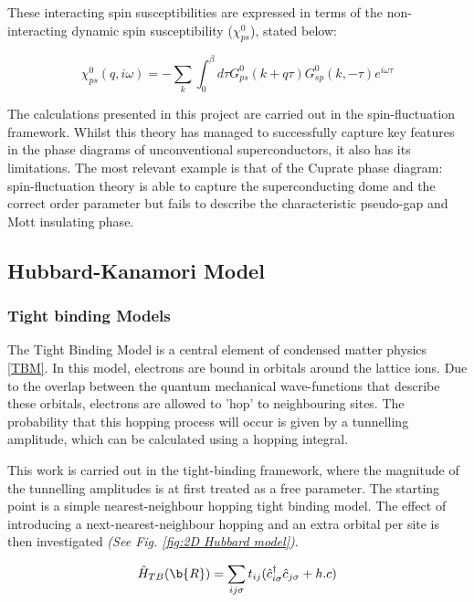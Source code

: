 \documentclass[12pt]{article}
\begin{document}
\noindent These interacting spin susceptibilities are expressed in terms of the non-interacting dynamic spin susceptibility ($\chi_{ps}^0$)\cite{moriya2000spin}, stated below: 

\begin{equation}\label{chi 0}
    \chi_{ps}^0(q, i \omega) = -\sum_{k} \int_{0}^{\beta} d\tau G^0_{ps}(k+q \tau) G^0_{sp}(k, -\tau)e^{i\omega \tau}
\end{equation} 

\noindent The calculations presented in this project are carried out in the spin-fluctuation framework. 
Whilst this theory has managed to successfully capture key features in the phase diagrams of unconventional superconductors, it also has its limitations.
The most relevant example is that of the Cuprate phase diagram:
spin-fluctuation theory is able to capture the superconducting dome and the correct order parameter \cite{moriya2006developments, scalapino1995case} 
but fails
to describe the characteristic pseudo-gap and Mott insulating phase\cite{timusk1999pseudogap}.


\subsection{Hubbard-Kanamori Model}

\subsubsection{Tight binding Models}

The Tight Binding Model is a central element of condensed matter physics \eqref{TBM}. In this model, electrons are bound in orbitals around the lattice ions.
Due to the overlap between the quantum mechanical wave-functions that describe these orbitals, electrons are allowed to 'hop' to neighbouring sites. The probability that this hopping process will occur is given by a tunnelling amplitude, which can be calculated using a hopping integral. \par
\medskip
\noindent This work is carried out in the tight-binding framework, where the magnitude of the tunnelling amplitudes is at first treated as a free parameter. 
The starting point is a simple nearest-neighbour hopping tight binding model. 
The effect of introducing a next-nearest-neighbour hopping and an extra orbital per site
is then investigated \textit{(See Fig. \ref{fig:2D Hubbard model})}.



\begin{equation} \label{TBM}
    \hat{H}_{TB}(\b{R}) = \sum_{ij\sigma} t_{ij}(\hat{c}_{i\sigma}^{\dagger}\hat{c}_{j \sigma} + h.c)
\end{equation}
\end{document}
